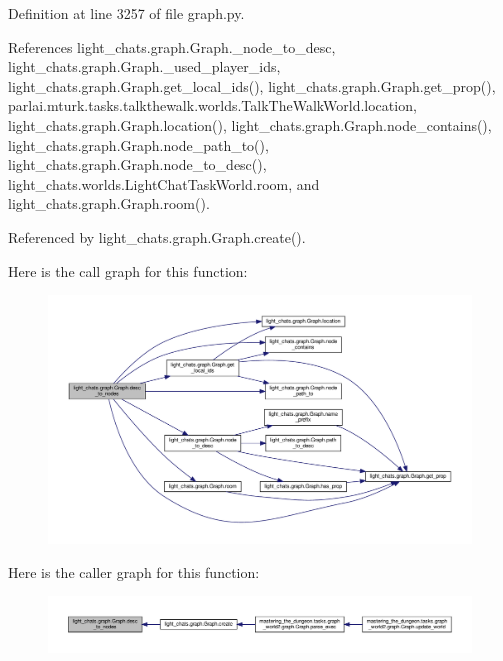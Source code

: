 Definition at line 3257 of file graph.\+py.



References light\+\_\+chats.\+graph.\+Graph.\+\_\+node\+\_\+to\+\_\+desc, light\+\_\+chats.\+graph.\+Graph.\+\_\+used\+\_\+player\+\_\+ids, light\+\_\+chats.\+graph.\+Graph.\+get\+\_\+local\+\_\+ids(), light\+\_\+chats.\+graph.\+Graph.\+get\+\_\+prop(), parlai.\+mturk.\+tasks.\+talkthewalk.\+worlds.\+Talk\+The\+Walk\+World.\+location, light\+\_\+chats.\+graph.\+Graph.\+location(), light\+\_\+chats.\+graph.\+Graph.\+node\+\_\+contains(), light\+\_\+chats.\+graph.\+Graph.\+node\+\_\+path\+\_\+to(), light\+\_\+chats.\+graph.\+Graph.\+node\+\_\+to\+\_\+desc(), light\+\_\+chats.\+worlds.\+Light\+Chat\+Task\+World.\+room, and light\+\_\+chats.\+graph.\+Graph.\+room().



Referenced by light\+\_\+chats.\+graph.\+Graph.\+create().

Here is the call graph for this function\+:
\nopagebreak
\begin{figure}[H]
\begin{center}
\leavevmode
\includegraphics[width=350pt]{classlight__chats_1_1graph_1_1Graph_a67fd9624112a695cd6e1a0b92ec3139b_cgraph}
\end{center}
\end{figure}
Here is the caller graph for this function\+:
\nopagebreak
\begin{figure}[H]
\begin{center}
\leavevmode
\includegraphics[width=350pt]{classlight__chats_1_1graph_1_1Graph_a67fd9624112a695cd6e1a0b92ec3139b_icgraph}
\end{center}
\end{figure}
\mbox{\label{classlight__chats_1_1graph_1_1Graph_a74bc5374a9c9f411008e726fac4cd7f1}} 
